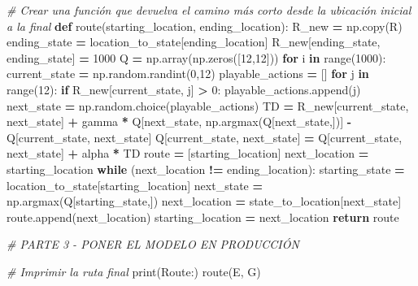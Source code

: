 \documentclass[
]{book}
\newenvironment{Shaded}{\begin{snugshade}}{\end{snugshade}}
\newcommand{\BuiltInTok}[1]{#1}
\newcommand{\CommentTok}[1]{\textcolor[rgb]{0.56,0.35,0.01}{\textit{#1}}}
\newcommand{\ControlFlowTok}[1]{\textcolor[rgb]{0.13,0.29,0.53}{\textbf{#1}}}
\newcommand{\DecValTok}[1]{\textcolor[rgb]{0.00,0.00,0.81}{#1}}
\newcommand{\KeywordTok}[1]{\textcolor[rgb]{0.13,0.29,0.53}{\textbf{#1}}}
\newcommand{\NormalTok}[1]{#1}
\newcommand{\OperatorTok}[1]{\textcolor[rgb]{0.81,0.36,0.00}{\textbf{#1}}}
\newcommand{\StringTok}[1]{\textcolor[rgb]{0.31,0.60,0.02}{#1}}
\begin{document}
\begin{Shaded}
\begin{Highlighting}[]
\CommentTok{\# Crear una función que devuelva el camino más corto desde la ubicación inicial a la final}
\KeywordTok{def}\NormalTok{ route(starting\_location, ending\_location):}
\NormalTok{    R\_new }\OperatorTok{=}\NormalTok{ np.copy(R)}
\NormalTok{    ending\_state }\OperatorTok{=}\NormalTok{ location\_to\_state[ending\_location]}
\NormalTok{    R\_new[ending\_state, ending\_state] }\OperatorTok{=} \DecValTok{1000}
\NormalTok{    Q }\OperatorTok{=}\NormalTok{ np.array(np.zeros([}\DecValTok{12}\NormalTok{,}\DecValTok{12}\NormalTok{]))}
    \ControlFlowTok{for}\NormalTok{ i }\KeywordTok{in} \BuiltInTok{range}\NormalTok{(}\DecValTok{1000}\NormalTok{):}
\NormalTok{        current\_state }\OperatorTok{=}\NormalTok{ np.random.randint(}\DecValTok{0}\NormalTok{,}\DecValTok{12}\NormalTok{)}
\NormalTok{        playable\_actions }\OperatorTok{=}\NormalTok{ []}
        \ControlFlowTok{for}\NormalTok{ j }\KeywordTok{in} \BuiltInTok{range}\NormalTok{(}\DecValTok{12}\NormalTok{):}
            \ControlFlowTok{if}\NormalTok{ R\_new[current\_state, j] }\OperatorTok{\textgreater{}} \DecValTok{0}\NormalTok{:}
\NormalTok{                playable\_actions.append(j)}
\NormalTok{        next\_state }\OperatorTok{=}\NormalTok{ np.random.choice(playable\_actions)}
\NormalTok{        TD }\OperatorTok{=}\NormalTok{ R\_new[current\_state, next\_state]}
             \OperatorTok{+}\NormalTok{ gamma }\OperatorTok{*}\NormalTok{ Q[next\_state, np.argmax(Q[next\_state,])]}
             \OperatorTok{{-}}\NormalTok{ Q[current\_state, next\_state]}
\NormalTok{        Q[current\_state, next\_state] }\OperatorTok{=}\NormalTok{ Q[current\_state, next\_state] }\OperatorTok{+}\NormalTok{ alpha }\OperatorTok{*}\NormalTok{ TD}
\NormalTok{    route }\OperatorTok{=}\NormalTok{ [starting\_location]}
\NormalTok{    next\_location }\OperatorTok{=}\NormalTok{ starting\_location}
    \ControlFlowTok{while}\NormalTok{ (next\_location }\OperatorTok{!=}\NormalTok{ ending\_location):}
\NormalTok{        starting\_state }\OperatorTok{=}\NormalTok{ location\_to\_state[starting\_location]}
\NormalTok{        next\_state }\OperatorTok{=}\NormalTok{ np.argmax(Q[starting\_state,])}
\NormalTok{        next\_location }\OperatorTok{=}\NormalTok{ state\_to\_location[next\_state]}
\NormalTok{        route.append(next\_location)}
\NormalTok{        starting\_location }\OperatorTok{=}\NormalTok{ next\_location}
    \ControlFlowTok{return}\NormalTok{ route}

\CommentTok{\# PARTE 3 {-} PONER EL MODELO EN PRODUCCIÓN}

\CommentTok{\# Imprimir la ruta final}
\BuiltInTok{print}\NormalTok{(}\StringTok{\textquotesingle{}Route:\textquotesingle{}}\NormalTok{)}
\NormalTok{route(}\StringTok{\textquotesingle{}E\textquotesingle{}}\NormalTok{, }\StringTok{\textquotesingle{}G\textquotesingle{}}\NormalTok{)}
\end{Highlighting}
\end{Shaded}
\end{document}
